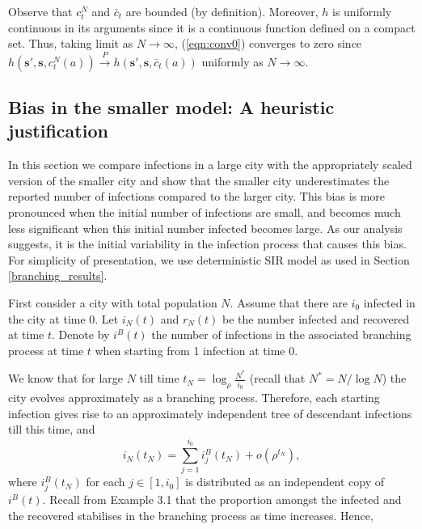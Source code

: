 \documentclass{article}
\theoremstyle{definition}
\begin{document}
  
 Observe that $c^N_{t}$ and $\bar{c}_{t}$ are bounded (by definition). Moreover, ${h}$ is uniformly continuous in its arguments since it is a continuous function defined on a compact set. Thus, taking limit as $N\rightarrow \infty$, (\ref{eqn:conv0}) converges to zero 
  since ${h}(\bm{s'},\bm{s},c^N_{t}({a})) \xrightarrow{P} {h}(\bm{s'},\bm{s},\bar{c}_t({a}))$ uniformly as $N\rightarrow\infty$.
 

  

\subsection{Bias in the smaller model: A heuristic justification}
\label{heuristic_initial}

In this section we compare infections in a large city  with the  appropriately scaled version of the smaller  city and show that the
smaller city underestimates the reported number of infections compared to the larger city. This bias  is more pronounced
when the initial number of infections are small, and becomes much less significant when this initial number infected  becomes large. 
As our analysis suggests, it is the initial variability in the infection process that causes this bias. 
 For simplicity of presentation, we use deterministic SIR model as used in Section \ref{branching_results}.


First consider a city with total population $N$. Assume that there are  $i_0$ infected in the city at time 0. Let $i_{N}(t)$ and $r_{N}(t)$ be the number  infected and recovered at time $t$. Denote by $i^B(t)$ the number of infections in the associated  branching process at time $t$ when starting from 1 infection at time 0.


We know that for large $N$ till time $t_N = \log_{\rho} \frac{N^*}{i_0} $ (recall that $N^*=N/\log N$) the city evolves approximately as a branching process. Therefore, each starting infection gives rise to an  approximately independent tree of descendant infections till this time, and
\[i_{N}(t_N) = \sum_{j=1}^{i_0}i^B_j(t_N) + o(\rho^{t_N}),\]
where $i^B_j(t_N)$ for each $j\in [1,i_0]$ is distributed as an independent copy of $i^B(t)$. Recall from Example 3.1 that the proportion amongst the  infected and the recovered stabilises in the branching process as time increases. Hence, 
\end{document}
